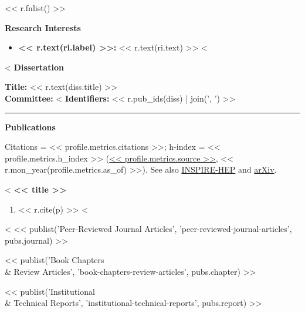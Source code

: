 \documentclass[11pt]{article}
\begin{document}
<< r.fnlist() >>

\medskip

{\Large\textbf{Research Interests}}

\begin{itemize}[leftmargin=*,nosep]
<%
    \item \textbf{<< r.text(ri.label) >>:} << r.text(ri.text) >>
<%
\end{itemize}

\medskip

<%
{\Large\textbf{Dissertation}}

\textbf{Title:} << r.text(diss.title) >>\\[0.3em]
\textbf{Committee:} <%
\textbf{Identifiers:} << r.pub_ids(diss) | join(', ') >>

\noindent\rule{\linewidth}{1.0pt}

{\Large\textbf{Publications}}

Citations = << profile.metrics.citations >>; h-index = << profile.metrics.h_index >> (\href{<< profile.links.scholar >>}{<< profile.metrics.source >>}, << r.mon_year(profile.metrics.as_of) >>). See also \href{<< profile.links.inspire >>}{INSPIRE-HEP} and \href{<< profile.links.arxiv >>}{arXiv}.

<%
{\large\textbf{<< title >>}}

\begin{enumerate}[leftmargin=*,nosep]
<%
    \item << r.cite(p) >>
<%
\end{enumerate}
<%
<< publist('Peer-Reviewed Journal Articles', 'peer-reviewed-journal-articles', pubs.journal) >>
\medskip

<< publist('Book Chapters \\& Review Articles', 'book-chapters-review-articles', pubs.chapter) >>
\medskip

<< publist('Institutional \\& Technical Reports', 'institutional-technical-reports', pubs.report) >>
\medskip
\end{document}
